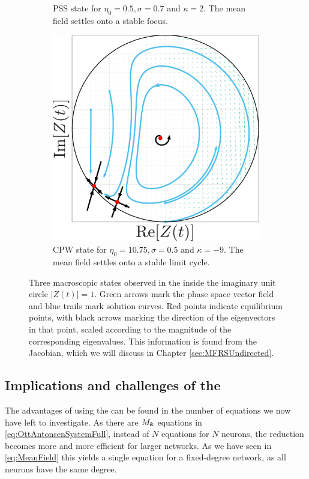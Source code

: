 \begin{figure}[H]
\begin{subfigure}[b]{0.32\linewidth}
   \caption{PSS state for $\eta_0 = 0.5, \sigma = 0.7$ and $\kappa= 2$. The mean field settles onto a stable focus.}
   \label{fig:MFRPSS}
\end{subfigure} \hfill
\begin{subfigure}[b]{0.32\linewidth}
   \centering
  \includegraphics[width=\linewidth]{../Figures/PhaseSpace/MFRCPW.pdf}
   \caption{CPW state for $\eta_0 = 10.75, \sigma = 0.5$ and $\kappa= -9$. The mean field settles onto a stable limit cycle.}
   \label{fig:MFRCPW}
\end{subfigure}
   \caption{Three macroscopic states observed in the \MFR inside the imaginary unit circle $|Z(t)| = 1$. Green arrows mark the phase space vector field and blue trails mark solution curves. Red points indicate equilibrium points, with black arrows marking the direction of the eigenvectors in that point, scaled according to the magnitude of the corresponding eigenvalues. This information is found from the Jacobian, which we will discuss in Chapter \ref{sec:MFRSUndirected}.}
   \label{fig:macroscopicstatesfixeddegree}
\end{figure}


\subsection{Implications and challenges of the \MFR}
The advantages of using the \MFR can be found in the number of equations we now have left to investigate. As there are $M_{{\boldsymbol{k}}}$ equations in \eqref{eq:OttAntonsenSystemFull}, instead of $N$ equations for $N$ neurons, the reduction becomes more and more efficient for larger networks. As we have seen in \eqref{eq:MeanField} this yields a single equation for a fixed-degree network, as all neurons have the same degree.\\

